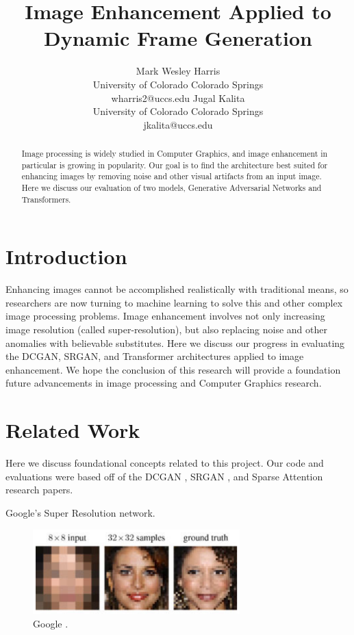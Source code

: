 \documentclass[letterpaper]{article} %
\title{Image Enhancement Applied to Dynamic Frame Generation}
\author{Mark Wesley Harris\\ %
University of Colorado Colorado Springs\\
wharris2@uccs.edu %
\And
Jugal Kalita\\
University of Colorado Colorado Springs\\
jkalita@uccs.edu
}
\begin{document}
\maketitle

\begin{abstract}
Image processing is
widely studied in Computer Graphics, and
image enhancement in particular is growing in popularity.
Our goal is to find the architecture best suited for
enhancing images by removing
noise and other visual artifacts from an input image.
Here we discuss our evaluation of two models,
Generative Adversarial Networks and Transformers.
\end{abstract}

\section{Introduction}
Enhancing images cannot be accomplished realistically with traditional means,
so researchers are now turning to machine learning to solve
this and other complex image processing problems.
Image enhancement involves not only increasing image resolution
(called super-resolution), but also replacing noise and other anomalies with
believable substitutes.
Here we discuss our progress in evaluating
the DCGAN, SRGAN, and Transformer architectures
applied to image enhancement.
We hope the conclusion of this research will
provide a foundation
future advancements in image processing
and Computer Graphics research.

\section{Related Work}
Here we discuss foundational concepts related to this project.
Our code and evaluations were based off of the DCGAN
\cite{generative_adversarial_networks}, SRGAN
\cite{srgan}, and Sparse Attention
\cite{generative_transformers} research papers.

Google's Super Resolution network.

\begin{figure}[htbp]
\centerline{\includegraphics[width=8cm]{google.png}}
\caption{Google \cite{google}.}
\label{fig:google}
\end{figure}
\end{document}
